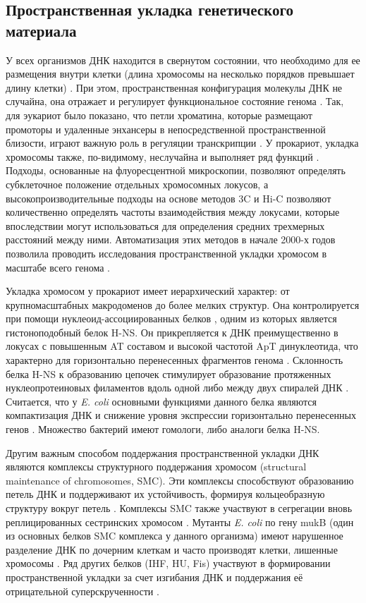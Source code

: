 \subsection{Пространственная укладка генетического материала}
У всех организмов ДНК находится в свернутом состоянии, что необходимо для ее размещения внутри клетки (длина хромосомы на несколько порядков превышает длину клетки) \cite{dame2020chromosome}. При этом, пространственная конфигурация молекулы ДНК не случайна, она отражает и регулирует функциональное состояние генома \cite{dekker2008gene}. Так, для эукариот было показано, что петли хроматина, которые размещают промоторы и удаленные энхансеры в непосредственной пространственной близости, играют важную роль в регуляции транскрипции \cite{vernimmen2007long}. У прокариот, укладка хромосомы также, по-видимому, неслучайна и выполняет ряд функций \cite{hofmann2015role}. Подходы, основанные на флуоресцентной микроскопии, позволяют определять субклеточное положение отдельных хромосомных локусов, а высокопроизводительные подходы на основе методов 3C и Hi-C позволяют количественно определять частоты взаимодействия между локусами, которые впоследствии могут использоваться для определения средних трехмерных расстояний между ними. Автоматизация этих методов в начале 2000-х годов позволила проводить исследования пространственной укладки хромосом в масштабе всего генома \cite{umbarger2011three}. 
 
Укладка хромосом у прокариот имеет иерархический характер: от крупномасштабных макродоменов до более мелких структур. Она контролируется при помощи нуклеоид-ассоциированных белков \cite{dame2020chromosome}, одним из которых является гистоноподобный белок H-NS. Он прикрепляется к ДНК преимущественно в локусах с повышенным AT составом и высокой частотой ApT динуклеотида, что характерно для горизонтально перенесенных фрагментов генома \cite{lucchini2006h}. Склонность белка H-NS к образованию цепочек стимулирует образование протяженных нуклеопротеиновых филаментов вдоль одной либо между двух спиралей ДНК \cite{dame2006bacterial}. Считается, что у \textit{E. coli} основными функциями данного белка являются компактизация ДНК и снижение уровня экспрессии горизонтально перенесенных генов \cite{dame2020chromosome}. Множество бактерий имеют гомологи, либо аналоги белка H-NS.

 Другим важным способом поддержания пространственной укладки ДНК являются комплексы структурного поддержания хромосом (structural maintenance of chromosomes, SMC). Эти комплексы способствуют образованию петель ДНК и поддерживают их устойчивость, формируя кольцеобразную структуру вокруг петель \cite{nolivos2014bacterial}. Комплексы SMC также участвуют в сегрегации вновь реплицированных сестринских хромосом \cite{dame2020chromosome}. Мутанты \textit{E. coli} по гену mukB (один из основных белков SMC комплекса у данного организма) имеют нарушенное разделение ДНК по дочерним клеткам и часто производят клетки, лишенные хромосомы \cite{hiraga1989chromosome}. Ряд других белков (IHF, HU, Fis) участвуют в формировании пространственной укладки за счет изгибания ДНК и поддержания её отрицательной суперскрученности \cite{dame2020chromosome}. 

